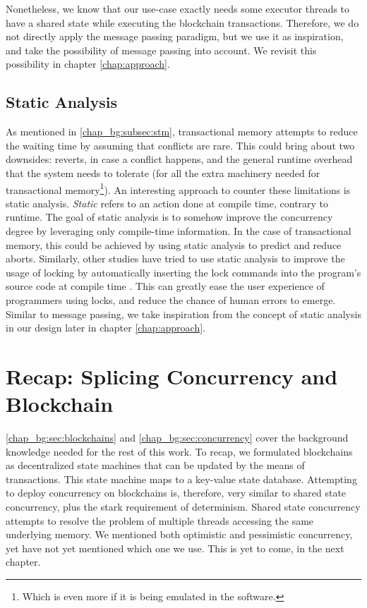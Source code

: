 Nonetheless, we know that our use-case exactly needs some executor threads to have a shared state
while executing the blockchain transactions. Therefore, we do not directly apply the message passing
paradigm, but we use it as inspiration, and take the possibility of message passing into account. We
revisit this possibility in chapter \ref{chap:approach}.

\subsection{Static Analysis}

As mentioned in \ref{chap_bg:subsec:stm}, transactional memory attempts to reduce the waiting time
by assuming that conflicts are rare. This could bring about two downsides: reverts, in case a
conflict happens, and the general runtime overhead that the system needs to tolerate (for all the
extra machinery needed for transactional memory\footnote{Which is even more if it is being emulated
in the software.}). An interesting approach to counter these limitations is static analysis.
\textit{Static} refers to an action done at compile time, contrary to runtime. The goal of static
analysis is to somehow improve the concurrency degree by leveraging only compile-time information.
In the case of transactional memory, this could be achieved by using static analysis to predict and
reduce aborts\cite{diasEfficientCorrectTransactional}. Similarly, other studies have tried to use
static analysis to improve the usage of locking by automatically inserting the lock commands into
the program's source code at compile time \cite{cheremInferringLocksAtomic2007}. This can greatly
ease the user experience of programmers using locks, and reduce the chance of human errors to
emerge. Similar to message passing, we take inspiration from the concept of static analysis in our design
later in chapter \ref{chap:approach}.

\section{Recap: Splicing Concurrency and Blockchain}

\ref{chap_bg:sec:blockchains} and \ref{chap_bg:sec:concurrency} cover the background knowledge
needed for the rest of this work. To recap, we formulated blockchains as decentralized state
machines that can be updated by the means of transactions. This state machine maps to a key-value
state database. Attempting to deploy concurrency on blockchains is, therefore, very similar to
shared state concurrency, plus the stark requirement of determinism. Shared state concurrency
attempts to resolve the problem of multiple threads accessing the same underlying memory. We
mentioned both optimistic and pessimistic concurrency, yet have not yet mentioned which one we use.
This is yet to come, in the next chapter.
